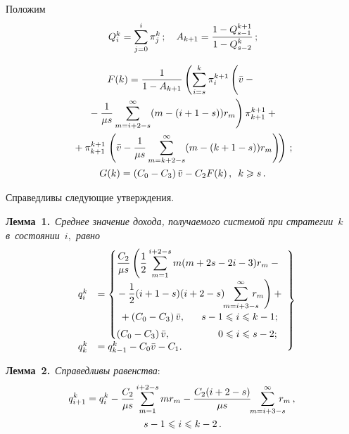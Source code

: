 \begin{multicols}{2}
Положим
\begin{equation*}
Q_i^k=\sum\limits_{j=0}^i\pi_j^k\,;\quad
A_{k+1}=\displaystyle\frac{\displaystyle 1-Q_{s-1}^{k+1}\mathstrut}{\displaystyle 1-Q_{s-2}^k\mathstrut}\,;
\end{equation*}

\noindent
\begin{multline}
F(k)=\fr{1}{1-A_{k+1}}\left(\sum\limits_{i=s}^k\pi_i^{k+1}\left(
\vphantom{\sum\limits_{i=s}^k}
\bar{v}-{}\right.\right.\\
\left.{}-\fr{1}{\mu s}\sum\limits_{m=i+2-s}^{\infty}(m-(i+1-s))r_m
\right)\pi_{k+1}^{k+1}
+{}
\\
{}+\pi_{k+1}^{k+1}\left. \left(\bar{v}-\fr{1}{\mu s}
\sum\limits_{m=k+2-s}^{\infty}(m-(k+1-s))r_m \right)\!\right)\,;\\
G(k)=\left(C_0-C_3\right)\bar{v}-C_2F(k)\,,\enskip k\geqslant s\,.
\label{5}
\end{multline}

 Справедливы следующие утверждения.
 
\smallskip

 \noindent
\textbf{Лемма~1.}\ 
\textit{Среднее значение дохода, получаемого сис\-те\-мой при стратегии~$k$ 
в~состоянии~$i,$ равно}
\begin{equation}
\left.
\begin{array}{rl}
\!q_i^k&=\begin{cases}
\fr{C_2}{\mu s}\left(
\vphantom{\sum\limits_{m=i+3-s}^{\infty}}
\fr{1}{2}\sum\limits_{m=1}^{i+2-s}
m(m+2s-2i-3)r_m-{}\right.\\[3pt]
\displaystyle\left.\!{}-\fr{1}{2}(i+1-s)(i+2-s)\!\!\sum\limits_{m=i+3-s}^{\infty}
\!\!\!\!\!r_m\right)+{}&\\[3pt]
\displaystyle\hspace*{1mm}{} +\left(C_0-C_3\right)\bar{v},& 
\hspace*{-33mm}s-1\leqslant i\leqslant k-1;\\[3pt]
\displaystyle\left(C_0-C_3\right)\bar{v},&\hspace*{-27mm} 0\leqslant i\leqslant s-2;
\end{cases}\\[6pt]
\!q_k^k&=q_{k-1}^k-C_0\bar{v}-C_1.
\end{array}\!\!\!\!\!\!\!\!
\right\}\!\!
\label{6}
\end{equation}


\noindent
\textbf{Лемма~2.}\ 
\textit{Справедливы равенства}:
\begin{multline}
\! q_{i+1}^k=q_i^k-\fr{C_2}{\mu s}
\sum\limits_{m=1}^{i+2-s}mr_m-\fr{C_2(i+2-s)}{\mu s}
\!\!\sum\limits_{m=i+3-s}^{\infty} \!\!\!\!\!r_m\,,\\
s-1\leqslant i\leqslant k-2\,.
\label{7}
\end{multline}



\end{multicols}
